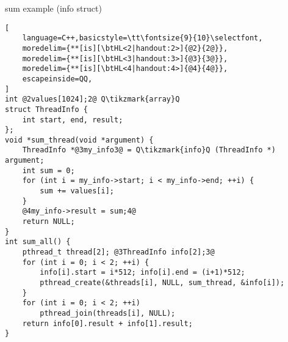\begin{frame}[fragile,label=sumToStack]{sum example (info struct)}
\begin{lstlisting}[
    language=C++,basicstyle=\tt\fontsize{9}{10}\selectfont,
    moredelim={**[is][\btHL<2|handout:2>]{@2}{2@}},
    moredelim={**[is][\btHL<3|handout:3>]{@3}{3@}},
    moredelim={**[is][\btHL<4|handout:4>]{@4}{4@}},
    escapeinside=QQ,
]
int @2values[1024];2@ Q\tikzmark{array}Q
struct ThreadInfo {
    int start, end, result;
};
void *sum_thread(void *argument) {
    ThreadInfo *@3my_info3@ = Q\tikzmark{info}Q (ThreadInfo *) argument;
    int sum = 0;
    for (int i = my_info->start; i < my_info->end; ++i) {
        sum += values[i];
    }
    @4my_info->result = sum;4@
    return NULL;
}
int sum_all() {
    pthread_t thread[2]; @3ThreadInfo info[2];3@
    for (int i = 0; i < 2; ++i) {
        info[i].start = i*512; info[i].end = (i+1)*512;
        pthread_create(&threads[i], NULL, sum_thread, &info[i]);
    }
    for (int i = 0; i < 2; ++i)
        pthread_join(threads[i], NULL);
    return info[0].result + info[1].result;
}
\end{lstlisting}
\end{frame}
